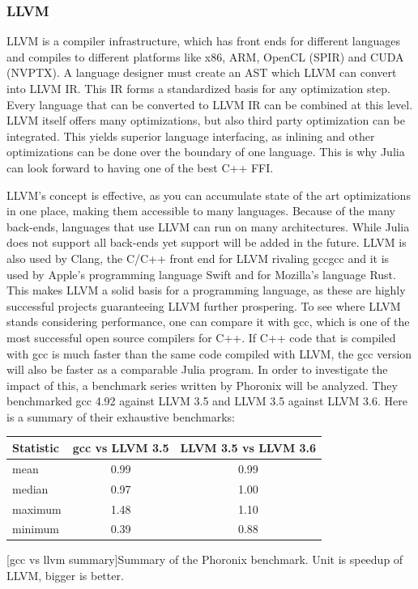 \subsubsection{\ac{LLVM}}

\ac{LLVM} is a compiler infrastructure, which has front ends for different languages and compiles to different platforms like x86, ARM, \ac{OpenCL} (SPIR) and \ac{CUDA} (NVPTX). 
A language designer must create an \ac{AST} which \ac{LLVM} can convert into \ac{LLVM} \ac{IR}. This \ac{IR} forms a standardized basis for any optimization step. Every language that can be converted to \ac{LLVM} \ac{IR} can be combined at this level. \ac{LLVM} itself offers many optimizations, but also third party optimization can be integrated.
This yields superior language interfacing, as inlining and other optimizations can be done over the boundary of one language.
This is why Julia can look forward to having one of the best C++ \ac{FFI}\cite{Cxx}.

\ac{LLVM}'s concept is effective, as you can accumulate state of the art optimizations in one place, making them accessible to many languages. Because of the many back-ends, languages that use \ac{LLVM} can run on many architectures. While Julia does not support all back-ends yet support will be added in the future.
\ac{LLVM} is also used by Clang\cite{Clang}, the C/C++ front end for \ac{LLVM} rivaling \ac{gcc}\ac{gcc} and it is used by Apple's programming language Swift\cite{SWIFT} and for Mozilla's language Rust\cite{Rust}.
This makes \ac{LLVM} a solid basis for a programming language, as these are highly successful projects guaranteeing \ac{LLVM} further prospering.
To see where \ac{LLVM} stands considering performance, one can compare it with \ac{gcc}, which is one of the most successful open source compilers for C++.
If C++ code that is compiled with \ac{gcc} is much faster than the same code compiled with \ac{LLVM}, the \ac{gcc} version will also be faster as a comparable Julia program.
In order to investigate the impact of this, a benchmark series written by Phoronix will be analyzed.
They benchmarked \ac{gcc} 4.92 against \ac{LLVM} 3.5 and \ac{LLVM} 3.5 against \ac{LLVM} 3.6.
Here is a summary of their exhaustive benchmarks:
\begin{table}[ht]
  \centering
  \begin{tabular}{l|c|c}
    \hline
    \textbf{Statistic} & \textbf{\ac{gcc} vs \ac{LLVM} 3.5} & \textbf{\ac{LLVM} 3.5 vs \ac{LLVM} 3.6} \\
    \hline
    mean & 0.99 & 0.99 \\
    median & 0.97 & 1.00 \\
    maximum & 1.48 & 1.10 \\
    minimum & 0.39 & 0.88 \\
    \hline
  \end{tabular}
    [gcc vs llvm summary]{Summary of the Phoronix benchmark. Unit is speedup of \ac{LLVM}, bigger is better. \cite{LLVM35vsLLVM36}\cite{LLVMvsGCC}\cite{Phoronix}}
    \label{table:gccvsllvm}
\end{table}

